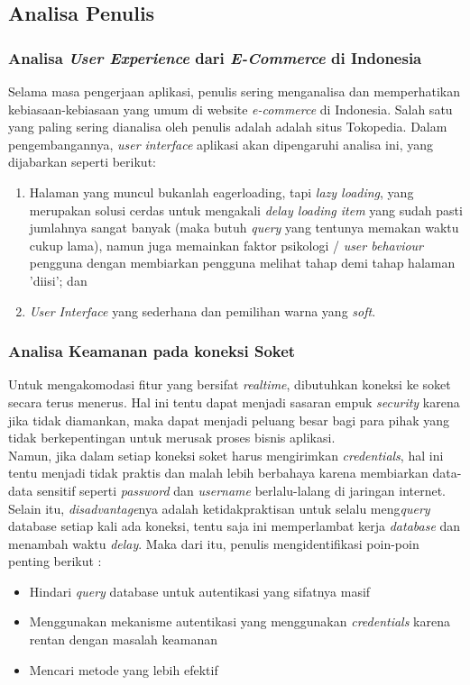 
\subsection{Analisa Penulis}
	\subsubsection{Analisa \textit{User Experience} dari \textit{E-Commerce} di Indonesia}
	\label{alasan-ux-ecommerce-indonesia alasan-app-serupa}
	Selama masa pengerjaan aplikasi, penulis sering menganalisa dan memperhatikan kebiasaan-kebiasaan yang umum di website \textit{e-commerce} di Indonesia. Salah satu yang paling sering dianalisa oleh penulis adalah adalah situs Tokopedia. Dalam pengembangannya, \textit{user interface} aplikasi akan dipengaruhi analisa ini, yang dijabarkan seperti berikut:
	\begin{enumerate}
		\item Halaman yang muncul bukanlah eagerloading, tapi \textit{lazy loading}, yang merupakan solusi cerdas untuk mengakali \textit{delay loading item} yang sudah pasti jumlahnya sangat banyak (maka butuh \textit{query} yang tentunya memakan waktu cukup lama), namun juga memainkan faktor psikologi / \textit{user behaviour} pengguna dengan membiarkan pengguna melihat tahap demi tahap halaman 'diisi'; dan
		\item \textit{User Interface} yang sederhana dan pemilihan warna yang \textit{soft}.
	\end{enumerate}
	
	\subsubsection{Analisa Keamanan pada koneksi Soket}
	\label{alasan-socket.io}
	Untuk mengakomodasi fitur yang bersifat \textit{realtime}, dibutuhkan koneksi ke soket secara terus menerus. Hal ini tentu dapat menjadi sasaran empuk \textit{security} karena jika tidak diamankan, maka dapat menjadi peluang besar bagi para pihak yang tidak berkepentingan untuk merusak proses bisnis aplikasi.\\
	\indent Namun, jika dalam setiap koneksi soket harus mengirimkan \textit{credentials}, hal ini tentu menjadi tidak praktis dan malah lebih berbahaya karena membiarkan data-data sensitif seperti \textit{password} dan \textit{username} berlalu-lalang di jaringan internet. Selain itu, \textit{disadvantage}nya adalah ketidakpraktisan untuk selalu meng\textit{query} database setiap kali ada koneksi, tentu saja ini memperlambat kerja \textit{database} dan menambah waktu \textit{delay}. Maka dari itu, penulis mengidentifikasi poin-poin penting berikut :
		\begin{itemize}
			\item Hindari \textit{query} database untuk autentikasi yang sifatnya masif
			\item Menggunakan mekanisme autentikasi yang menggunakan \textit{credentials} karena rentan dengan masalah keamanan
			\item Mencari metode yang lebih efektif
		\end{itemize}
	
